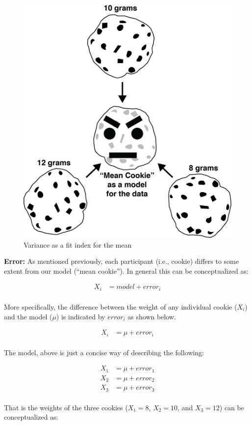 \documentclass[
]{krantz}
\begin{document}
\begin{figure}
\includegraphics[width=0.6\linewidth]{ch_populations/images/cookie} \caption{Variance as a fit index for the mean}\label{fig:meancookie}
\end{figure}

\textbf{Error:} As mentioned previously, each participant (i.e., cookie) differs to some extent from our model (``mean cookie''). In general this can be conceptualized as:

\[
\begin{aligned} 
X_i &= model + error_i \\
\end{aligned} 
\]

More specifically, the difference between the weight of any individual cookie (\(X_i\)) and the model (\(\mu\)) is indicated by \(error_i\) as shown below.

\[
\begin{aligned} 
X_i &= \mu + error_i \\
\end{aligned} 
\]

The model, above is just a concise way of describing the following:

\[
\begin{aligned} 
X_1 &= \mu + error_1 \\
X_2 &= \mu + error_2 \\
X_3 &= \mu + error_3 \\
\end{aligned} 
\]

That is the weights of the three cookies (\(X_1 = 8\), \(X_2 = 10\), and \(X_3 = 12\)) can be conceptualized as:
\end{document}
